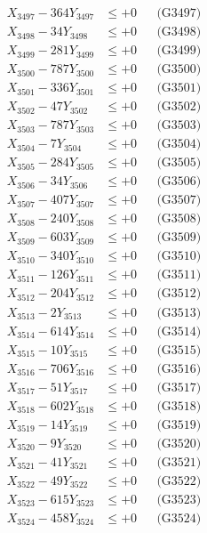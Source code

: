\documentclass[a4paper,10pt]{article}
\begin{document}
{\begin{align}
X_{3497} - 364Y_{3497} &\leq +0 && \text{(G3497)} \\
X_{3498} - 34Y_{3498} &\leq +0 && \text{(G3498)} \\
X_{3499} - 281Y_{3499} &\leq +0 && \text{(G3499)} \\
X_{3500} - 787Y_{3500} &\leq +0 && \text{(G3500)} \\
\allowbreak
X_{3501} - 336Y_{3501} &\leq +0 && \text{(G3501)} \\
X_{3502} - 47Y_{3502} &\leq +0 && \text{(G3502)} \\
X_{3503} - 787Y_{3503} &\leq +0 && \text{(G3503)} \\
X_{3504} - 7Y_{3504} &\leq +0 && \text{(G3504)} \\
X_{3505} - 284Y_{3505} &\leq +0 && \text{(G3505)} \\
X_{3506} - 34Y_{3506} &\leq +0 && \text{(G3506)} \\
X_{3507} - 407Y_{3507} &\leq +0 && \text{(G3507)} \\
X_{3508} - 240Y_{3508} &\leq +0 && \text{(G3508)} \\
X_{3509} - 603Y_{3509} &\leq +0 && \text{(G3509)} \\
X_{3510} - 340Y_{3510} &\leq +0 && \text{(G3510)} \\
\allowbreak
X_{3511} - 126Y_{3511} &\leq +0 && \text{(G3511)} \\
X_{3512} - 204Y_{3512} &\leq +0 && \text{(G3512)} \\
X_{3513} - 2Y_{3513} &\leq +0 && \text{(G3513)} \\
X_{3514} - 614Y_{3514} &\leq +0 && \text{(G3514)} \\
X_{3515} - 10Y_{3515} &\leq +0 && \text{(G3515)} \\
X_{3516} - 706Y_{3516} &\leq +0 && \text{(G3516)} \\
X_{3517} - 51Y_{3517} &\leq +0 && \text{(G3517)} \\
X_{3518} - 602Y_{3518} &\leq +0 && \text{(G3518)} \\
X_{3519} - 14Y_{3519} &\leq +0 && \text{(G3519)} \\
X_{3520} - 9Y_{3520} &\leq +0 && \text{(G3520)} \\
\allowbreak
X_{3521} - 41Y_{3521} &\leq +0 && \text{(G3521)} \\
X_{3522} - 49Y_{3522} &\leq +0 && \text{(G3522)} \\
X_{3523} - 615Y_{3523} &\leq +0 && \text{(G3523)} \\
X_{3524} - 458Y_{3524} &\leq +0 && \text{(G3524)} \\

\end{align}}
\end{document}
